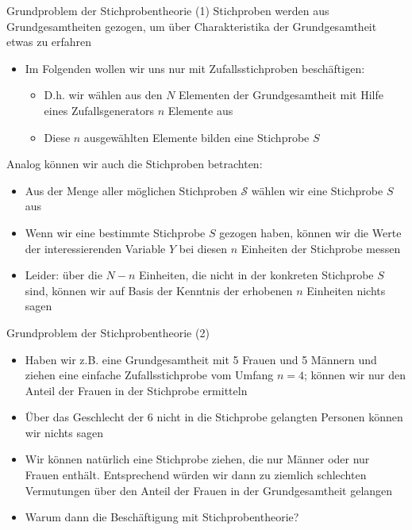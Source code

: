 \documentclass[9pt]{beamer}
\begin{document}
\begin{frame}{Grundproblem der Stichprobentheorie (1)}
Stichproben werden aus Grundgesamtheiten gezogen, um \"{u}ber Charakteristika der Grundgesamtheit etwas zu erfahren
\begin{itemize}
\item Im Folgenden wollen wir uns nur mit Zufallsstichproben besch\"{a}ftigen:
\begin{itemize}
\item D.h. wir w\"{a}hlen aus den $N$ Elementen der Grundgesamtheit mit Hilfe eines Zufallsgenerators $n$ Elemente aus
\item Diese $n$ ausgew\"{a}hlten Elemente bilden eine Stichprobe $S$
\end{itemize}
\end{itemize}
Analog k\"{o}nnen wir auch die Stichproben betrachten:
\begin{itemize}
\item Aus der Menge aller m\"{o}glichen Stichproben $\mathcal{S}$ w\"{a}hlen wir eine Stichprobe $S$ aus
\item Wenn wir eine bestimmte Stichprobe $S$ gezogen haben, k\"{o}nnen wir die Werte der interessierenden Variable $Y$ bei diesen $n$ Einheiten der Stichprobe messen
\item Leider: \"{u}ber die $N-n$ Einheiten, die nicht in der konkreten Stichprobe $S$ sind, k\"{o}nnen wir auf Basis der Kenntnis der erhobenen $n$ Einheiten nichts sagen
\end{itemize}
\end{frame}

\begin{frame}{Grundproblem der Stichprobentheorie (2)}
\begin{itemize}
  \item Haben wir z.B. eine Grundgesamtheit mit 5 Frauen und 5 M\"{a}nnern und ziehen eine einfache Zufallsstichprobe vom Umfang $n = 4$; k\"{o}nnen wir nur den Anteil der Frauen in der Stichprobe ermitteln
\item \"{U}ber das Geschlecht der $6$ nicht in die Stichprobe gelangten Personen k\"{o}nnen wir nichts sagen
\item Wir k\"{o}nnen nat\"{u}rlich eine Stichprobe ziehen, die nur M\"{a}nner oder nur Frauen enth\"{a}lt. Entsprechend w\"{u}rden wir dann zu ziemlich schlechten Vermutungen \"{u}ber den Anteil der Frauen in der Grundgesamtheit gelangen
\item Warum dann die Besch\"{a}ftigung mit Stichprobentheorie?
\end{itemize}
\end{frame}
\end{document}
